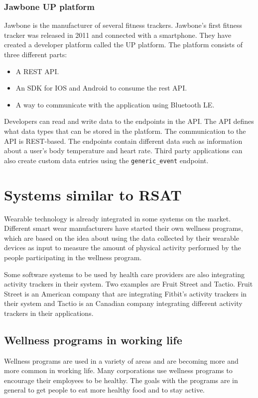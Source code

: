 \documentclass{cslthse-msc}
\begin{document}
\subsubsection{Jawbone UP platform}

Jawbone is the manufacturer of several fitness trackers. Jawbone's first fitness tracker was released in 2011 and connected with a smartphone\cite{guo2013evaluation}. They have created a developer platform called the UP platform. The platform consists of three different parts\cite{JawboneDeveloper}:

\begin{itemize}
\item A REST API.
\item An SDK for IOS and Android to consume the rest API.
\item A way to communicate with the application using Bluetooth LE.
\end{itemize}

Developers can read and write data to the endpoints in the API. The API defines what data types that can be stored in the platform. The communication to the API is REST-based. The endpoints contain different data such as information about a user's body temperature and heart rate. Third party applications can also create custom data entries using the \verb!generic_event! endpoint.\cite{JawboneCustomEndpoint}

\section{Systems similar to RSAT}

Wearable technology is already integrated in some systems on the market. Different smart wear manufacturers have started their own wellness programs, which are based on the idea about using the data collected by their wearable devices as input to measure the amount of physical activity performed by the people participating in the wellness program. 

Some software systems to be used by health care providers are also integrating activity trackers in their system. Two examples are Fruit Street and Tactio. Fruit Street is an American company that are integrating Fitbit's activity trackers in their system and Tactio is an Canadian company integrating different activity trackers in their applications.

\subsection{Wellness programs in working life}
\label{sec:wellness-programs}
Wellness programs are used in a variety of areas and are becoming more and more common in working life. Many corporations use wellness programs to encourage their employees to be healthy. The goals with the programs are in general to get people to eat more healthy food and to stay active.
\end{document}
